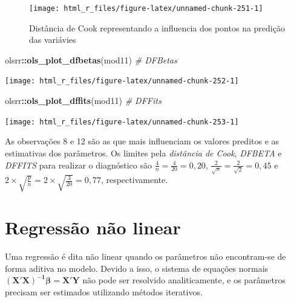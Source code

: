 \documentclass[
]{book}
\newenvironment{Shaded}{\begin{snugshade}}{\end{snugshade}}
\newcommand{\CommentTok}[1]{\textcolor[rgb]{0.56,0.35,0.01}{\textit{#1}}}
\newcommand{\KeywordTok}[1]{\textcolor[rgb]{0.13,0.29,0.53}{\textbf{#1}}}
\newcommand{\NormalTok}[1]{#1}
\newcommand{\OperatorTok}[1]{\textcolor[rgb]{0.81,0.36,0.00}{\textbf{#1}}}
\begin{document}
\begin{figure}

{\centering \texttt{[image: html\_r\_files/figure-latex/unnamed-chunk-251-1]} 

}

\caption{Distância de Cook representando a influencia dos pontos na predição das variávies}\label{fig:unnamed-chunk-251}
\end{figure}

\begin{Shaded}
\begin{Highlighting}[]
\NormalTok{olsrr}\OperatorTok{::}\KeywordTok{ols_plot_dfbetas}\NormalTok{(mod11) }\CommentTok{# DFBetas}
\end{Highlighting}
\end{Shaded}

\begin{center}\texttt{[image: html\_r\_files/figure-latex/unnamed-chunk-252-1]} \end{center}

\begin{Shaded}
\begin{Highlighting}[]
\NormalTok{olsrr}\OperatorTok{::}\KeywordTok{ols_plot_dffits}\NormalTok{(mod11) }\CommentTok{# DFFits}
\end{Highlighting}
\end{Shaded}

\begin{center}\texttt{[image: html\_r\_files/figure-latex/unnamed-chunk-253-1]} \end{center}

As observações 8 e 12 são as que mais influenciam os valores preditos e as estimativas dos parâmetros. Os limites pela \emph{distância de Cook}, \emph{DFBETA} e \emph{DFFITS} para realizar o diagnóstico são \(\frac{4}{n} = \frac{4}{20} = 0,20\), \(\frac{2}{\sqrt{n}} = \frac{2}{\sqrt{2}} = 0,45\) e \(2 \times \sqrt {\frac{p}{n}} = 2 \times \sqrt {\frac{3}{{20}}} = 0,77\), respectivamente.

\hypertarget{regressuxe3o-nuxe3o-linear}{%
\section{Regressão não linear}\label{regressuxe3o-nuxe3o-linear}}

Uma regressão é dita não linear quando os parâmetros não encontram-se de forma aditiva no modelo. Devido a isso, o sistema de equações normais \({\left( {{\boldsymbol{X'X}}} \right)^{{\boldsymbol{ - 1}}}}{\boldsymbol{\beta = X'Y}}\) não pode ser resolvido analiticamente, e os parâmetros precisam ser estimados utilizando métodos iterativos. 
\end{document}
